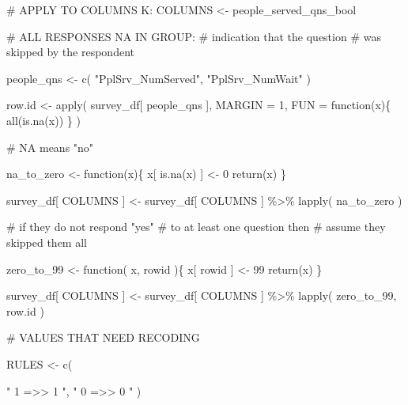 \documentclass[
  letterpaper,
]{scrbook}
\newenvironment{Shaded}{\begin{snugshade}}{\end{snugshade}}
\newcommand{\AttributeTok}[1]{\textcolor[rgb]{0.40,0.45,0.13}{#1}}
\newcommand{\CommentTok}[1]{\textcolor[rgb]{0.37,0.37,0.37}{#1}}
\newcommand{\ControlFlowTok}[1]{\textcolor[rgb]{0.00,0.23,0.31}{#1}}
\newcommand{\DecValTok}[1]{\textcolor[rgb]{0.68,0.00,0.00}{#1}}
\newcommand{\FunctionTok}[1]{\textcolor[rgb]{0.28,0.35,0.67}{#1}}
\newcommand{\NormalTok}[1]{\textcolor[rgb]{0.00,0.23,0.31}{#1}}
\newcommand{\OtherTok}[1]{\textcolor[rgb]{0.00,0.23,0.31}{#1}}
\newcommand{\SpecialCharTok}[1]{\textcolor[rgb]{0.37,0.37,0.37}{#1}}
\newcommand{\StringTok}[1]{\textcolor[rgb]{0.13,0.47,0.30}{#1}}
\begin{document}
\begin{Shaded}
\begin{Highlighting}[]
\CommentTok{\# APPLY TO COLUMNS K:}
\NormalTok{COLUMNS }\OtherTok{\textless{}{-}}\NormalTok{  people\_served\_qns\_bool}


\CommentTok{\# ALL RESPONSES NA IN GROUP:}
\CommentTok{\# indication that the question}
\CommentTok{\# was skipped by the respondent}

\NormalTok{people\_qns }\OtherTok{\textless{}{-}} \FunctionTok{c}\NormalTok{( }\StringTok{"PplSrv\_NumServed"}\NormalTok{, }\StringTok{"PplSrv\_NumWait"}\NormalTok{ )}

\NormalTok{row.id }\OtherTok{\textless{}{-}} \FunctionTok{apply}\NormalTok{( survey\_df[ people\_qns ], }
                 \AttributeTok{MARGIN =} \DecValTok{1}\NormalTok{, }
                 \AttributeTok{FUN =} \ControlFlowTok{function}\NormalTok{(x)\{ }\FunctionTok{all}\NormalTok{(}\FunctionTok{is.na}\NormalTok{(x)) \} ) }


\CommentTok{\# NA means "no"}

\NormalTok{na\_to\_zero }\OtherTok{\textless{}{-}} \ControlFlowTok{function}\NormalTok{(x)\{}
\NormalTok{  x[ }\FunctionTok{is.na}\NormalTok{(x) ] }\OtherTok{\textless{}{-}} \DecValTok{0}
  \FunctionTok{return}\NormalTok{(x)}
\NormalTok{\}}

\NormalTok{survey\_df[ COLUMNS ] }\OtherTok{\textless{}{-}} 
\NormalTok{  survey\_df[ COLUMNS ] }\SpecialCharTok{\%\textgreater{}\%} 
  \FunctionTok{lapply}\NormalTok{( na\_to\_zero )}

\CommentTok{\# if they do not respond "yes" }
\CommentTok{\# to at least one question then}
\CommentTok{\# assume they skipped them all}

\NormalTok{zero\_to\_99 }\OtherTok{\textless{}{-}} \ControlFlowTok{function}\NormalTok{( x, rowid )\{}
\NormalTok{  x[ rowid ] }\OtherTok{\textless{}{-}} \DecValTok{99}
  \FunctionTok{return}\NormalTok{(x)}
\NormalTok{\}}

\NormalTok{survey\_df[ COLUMNS ] }\OtherTok{\textless{}{-}} 
\NormalTok{  survey\_df[ COLUMNS ] }\SpecialCharTok{\%\textgreater{}\%} 
  \FunctionTok{lapply}\NormalTok{( zero\_to\_99, row.id )}

    

\CommentTok{\# VALUES THAT NEED RECODING}

\NormalTok{RULES }\OtherTok{\textless{}{-}} \FunctionTok{c}\NormalTok{(    }
          
             \StringTok{"    1    =\textgreater{}\textgreater{}     1   "}\NormalTok{, }
             \StringTok{"    0    =\textgreater{}\textgreater{}     0   "}\NormalTok{   )}



\end{Highlighting}
\end{Shaded}
\end{document}

